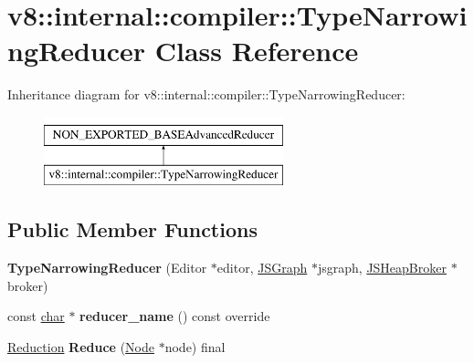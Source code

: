 \hypertarget{classv8_1_1internal_1_1compiler_1_1TypeNarrowingReducer}{}\section{v8\+:\+:internal\+:\+:compiler\+:\+:Type\+Narrowing\+Reducer Class Reference}
\label{classv8_1_1internal_1_1compiler_1_1TypeNarrowingReducer}
Inheritance diagram for v8\+:\+:internal\+:\+:compiler\+:\+:Type\+Narrowing\+Reducer\+:\begin{figure}[H]
\begin{center}
\leavevmode
\includegraphics[height=2.000000cm]{classv8_1_1internal_1_1compiler_1_1TypeNarrowingReducer}
\end{center}
\end{figure}
\subsection*{Public Member Functions}
\begin{DoxyCompactItemize}
\item 
\mbox{\label{classv8_1_1internal_1_1compiler_1_1TypeNarrowingReducer_a50704d9f23aaee8b3e9eb5499decbdc6}} 
{\bfseries Type\+Narrowing\+Reducer} (Editor $\ast$editor, \mbox{\hyperlink{classv8_1_1internal_1_1compiler_1_1JSGraph}{J\+S\+Graph}} $\ast$jsgraph, \mbox{\hyperlink{classv8_1_1internal_1_1compiler_1_1JSHeapBroker}{J\+S\+Heap\+Broker}} $\ast$broker)
\item 
\mbox{\label{classv8_1_1internal_1_1compiler_1_1TypeNarrowingReducer_a49b83e20a82eb8202069fba34c1354d6}} 
const \mbox{\hyperlink{classchar}{char}} $\ast$ {\bfseries reducer\+\_\+name} () const override
\item 
\mbox{\label{classv8_1_1internal_1_1compiler_1_1TypeNarrowingReducer_a809022261aacb172505338314528176a}} 
\mbox{\hyperlink{classv8_1_1internal_1_1compiler_1_1Reduction}{Reduction}} {\bfseries Reduce} (\mbox{\hyperlink{classv8_1_1internal_1_1compiler_1_1Node}{Node}} $\ast$node) final
\end{DoxyCompactItemize}


